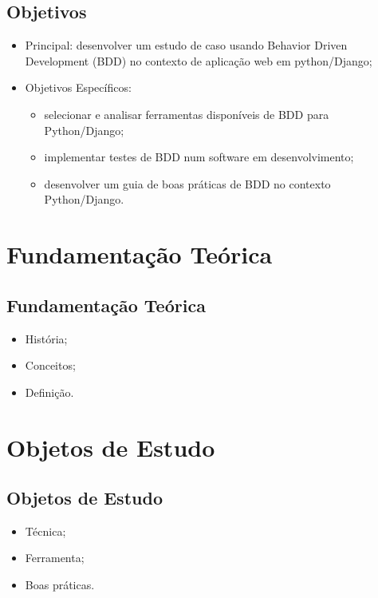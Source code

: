 \documentclass{beamer}
\begin{document}
\subsection{Objetivos}
\begin{frame}
  \begin{itemize}
    \item Principal: desenvolver um estudo de caso usando Behavior Driven Development (BDD) no contexto de aplicação web em python/Django;
    \item Objetivos Específicos:
        \begin{itemize}
            \item selecionar e analisar ferramentas disponíveis de BDD para Python/Django;
            \item implementar testes de BDD num software em desenvolvimento;
            \item desenvolver um guia de boas práticas de BDD no contexto Python/Django.
        \end{itemize}
  \end{itemize}
\end{frame}

\section{Fundamentação Teórica} %
\subsection{Fundamentação Teórica}
\begin{frame}
  \begin{itemize}
      \item História;  
      \item Conceitos;
      \item Definição.
  \end{itemize}
\end{frame}

\section{Objetos de Estudo}
\subsection{Objetos de Estudo}
\begin{frame}
    \begin{itemize}
        \item Técnica;
        \item Ferramenta;
        \item Boas práticas.
    \end{itemize}
\end{frame}
\end{document}
